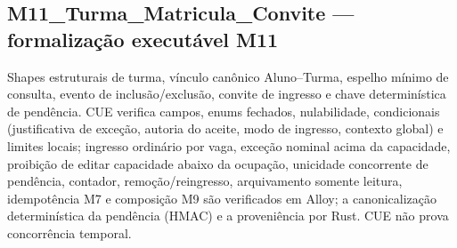 \subsection*{M11\_Turma\_Matricula\_Convite --- formalização executável M11}
Shapes estruturais de turma, vínculo canônico Aluno--Turma, espelho mínimo de consulta, evento de inclusão/exclusão, convite de ingresso e chave determinística de pendência. CUE verifica campos, enums fechados, nulabilidade, condicionais (justificativa de exceção, autoria do aceite, modo de ingresso, contexto global) e limites locais; ingresso ordinário por vaga, exceção nominal acima da capacidade, proibição de editar capacidade abaixo da ocupação, unicidade concorrente de pendência, contador, remoção/reingresso, arquivamento somente leitura, idempotência M7 e composição M9 são verificados em Alloy; a canonicalização determinística da pendência (HMAC) e a proveniência por Rust. CUE não prova concorrência temporal.
